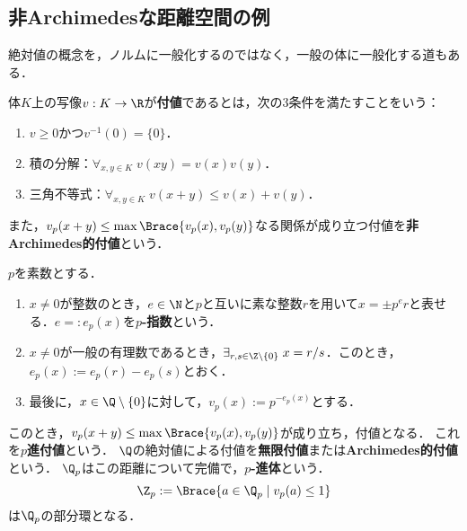 \documentclass[uplatex,dvipdfmx]{jsreport}
\begin{document}
\subsection{非Archimedesな距離空間の例}


\begin{tcolorbox}[colframe=ForestGreen, colback=ForestGreen!10!white,breakable,colbacktitle=ForestGreen!40!white,coltitle=black,fonttitle=\bfseries\sffamily,
    title=]
        絶対値の概念を，ノルムに一般化するのではなく，一般の体に一般化する道もある．
\end{tcolorbox}

\begin{definition}[valuation]
    体$K$上の写像$v:K\to\R$が\textbf{付値}であるとは，次の3条件を満たすことをいう：
    \begin{enumerate}
        \item $v\ge0$かつ$v^{-1}(0)=\{0\}$．
        \item 積の分解：$\forall_{x,y\in K}\;v(xy)=v(x)v(y)$．
        \item 三角不等式：$\forall_{x,y\in K}\;v(x+y)\le v(x)+v(y)$．
    \end{enumerate}
    また，$v_p(x+y)\le\max\Brace{v_p(x),v_p(y)}$なる関係が成り立つ付値を\textbf{非Archimedes的付値}という．
\end{definition}

\begin{example}
    $p$を素数とする．
    \begin{enumerate}
        \item $x\ne0$が整数のとき，$e\in\N$と$p$と互いに素な整数$r$を用いて$x=\pm p^er$と表せる．$e=:e_p(x)$を\textbf{$p$-指数}という．
        \item $x\ne0$が一般の有理数であるとき，$\exists_{r,s\in\Z\setminus\{0\}}\;x=r/s$．このとき，$e_p(x):=e_p(r)-e_p(s)$とおく．
        \item 最後に，$x\in\Q\setminus\{0\}$に対して，$v_p(x):=p^{-e_p(x)}$とする．
    \end{enumerate}
    このとき，$v_p(x+y)\le\max\Brace{v_p(x),v_p(y)}$が成り立ち，付値となる．
    これを\textbf{$p$進付値}という．
    $\Q$の絶対値による付値を\textbf{無限付値}または\textbf{Archimedes的付値}という．
    $\Q_p$はこの距離について完備で，\textbf{$p$-進体}という．
    \[\Z_p:=\Brace{a\in\Q_p\mid v_p(a)\le1}\]
    は$\Q_p$の部分環となる．
\end{example}

\begin{theorem}[付値が定める距離空間]
    
\end{theorem}
\end{document}
